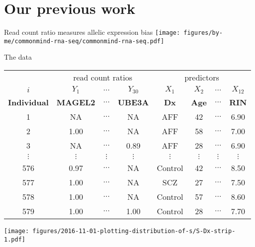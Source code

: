 \documentclass[usenames,dvipsnames]{beamer} %
\begin{document}
\section{Our previous work}

\begin{frame}{Read count ratio measures allelic expression bias}
\texttt{[image: figures/by-me/commonmind-rna-seq/commonmind-rna-seq.pdf]}
\end{frame}

\begin{frame}{The data}
\footnotesize
\begin{tabular}{|c|ccc|cccc|}
 & \multicolumn{3}{|c|}{read count ratios} & \multicolumn{4}{|c|}{predictors} \\
\(i\) & \(Y_1\) & \(\hdots\) & \(Y_{30}\) & \(X_1\) & \(X_2\) & \(\hdots\) & \(X_{12}\) \\
\textbf{Individual} & \textbf{MAGEL2} & \(\hdots\) & \textbf{UBE3A} & \textbf{Dx} & \textbf{Age} & \(\hdots\) & \textbf{RIN} \\
\hline
1 & NA & \(\hdots\) & NA & AFF & 42 & \(\hdots\) & 6.90 \\
2 & 1.00 & \(\hdots\) & NA & AFF & 58 & \(\hdots\) & 7.00 \\
3 & NA & \(\hdots\) & 0.89 & AFF & 28 & \(\hdots\) & 6.90 \\
\(\vdots\) & \(\vdots\) & \(\vdots\) & \(\vdots\) & \(\vdots\) & \(\vdots\) & \(\vdots\) & \(\vdots\) \\
576 & 0.97 & \(\hdots\) & NA & Control & 42 & \(\hdots\) & 8.50 \\
577 & 1.00 & \(\hdots\) & NA & SCZ & 27 & \(\hdots\) & 7.50 \\
578 & 1.00 & \(\hdots\) & NA & Control & 57 & \(\hdots\) & 8.60 \\
579 & 1.00 & \(\hdots\) & 1.00 & Control & 28 & \(\hdots\) & 7.70 \\
\end{tabular}
\end{frame}

\begin{frame}%
\begin{center}
\texttt{[image: figures/2016-11-01-plotting-distribution-of-s/S-Dx-strip-1.pdf]}
\end{center}
\end{frame}
\end{document}
